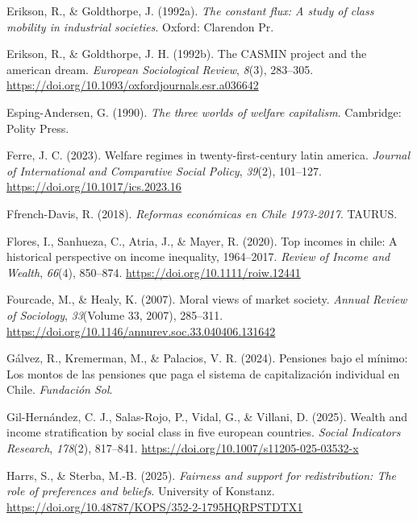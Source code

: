 \documentclass[
  12pt,
]{article}
\newlength{\cslhangindent}
\newenvironment{CSLReferences}[2] %
 {\begin{list}{}{%
  \setlength{\itemindent}{0pt}
  \setlength{\leftmargin}{0pt}
  \setlength{\parsep}{0pt}
  \ifodd #1
   \setlength{\leftmargin}{\cslhangindent}
   \setlength{\itemindent}{-1\cslhangindent}
  \fi
  \setlength{\itemsep}{#2\baselineskip}}}
 {\end{list}}
\begin{document}
\begin{CSLReferences}{1}{0}
Erikson, R., \& Goldthorpe, J. (1992a). \emph{The constant flux: A study
of class mobility in industrial societies}. Oxford: Clarendon Pr.

Erikson, R., \& Goldthorpe, J. H. (1992b). The CASMIN project and the
american dream. \emph{European Sociological Review}, \emph{8}(3),
283--305. \url{https://doi.org/10.1093/oxfordjournals.esr.a036642}

Esping-Andersen, G. (1990). \emph{The three worlds of welfare
capitalism}. Cambridge: Polity Press.

Ferre, J. C. (2023). Welfare regimes in twenty-first-century latin
america. \emph{Journal of International and Comparative Social Policy},
\emph{39}(2), 101--127. \url{https://doi.org/10.1017/ics.2023.16}

Ffrench-Davis, R. (2018). \emph{Reformas económicas en Chile 1973-2017}.
TAURUS.

Flores, I., Sanhueza, C., Atria, J., \& Mayer, R. (2020). Top incomes in
chile: A historical perspective on income inequality, 1964--2017.
\emph{Review of Income and Wealth}, \emph{66}(4), 850--874.
\url{https://doi.org/10.1111/roiw.12441}

Fourcade, M., \& Healy, K. (2007). Moral views of market society.
\emph{Annual Review of Sociology}, \emph{33}(Volume 33, 2007), 285--311.
\url{https://doi.org/10.1146/annurev.soc.33.040406.131642}

Gálvez, R., Kremerman, M., \& Palacios, V. R. (2024). Pensiones bajo el
mínimo: Los montos de las pensiones que paga el sistema de
capitalización individual en Chile. \emph{Fundación Sol}.

Gil-Hernández, C. J., Salas-Rojo, P., Vidal, G., \& Villani, D. (2025).
Wealth and income stratification by social class in five european
countries. \emph{Social Indicators Research}, \emph{178}(2), 817--841.
\url{https://doi.org/10.1007/s11205-025-03532-x}

Harrs, S., \& Sterba, M.-B. (2025). \emph{Fairness and support for
redistribution: The role of preferences and beliefs}. University of
Konstanz. \url{https://doi.org/10.48787/KOPS/352-2-1795HQRPSTDTX1}


\end{CSLReferences}
\end{document}
